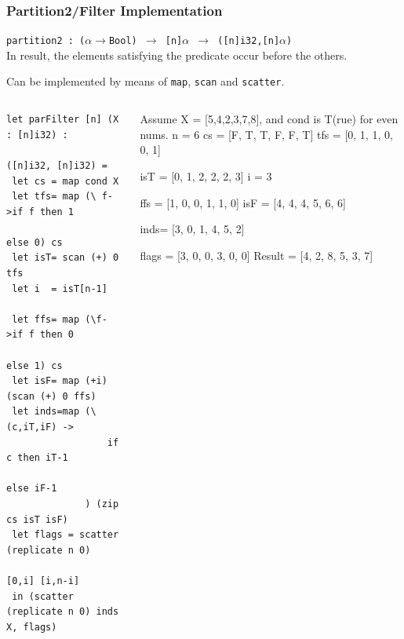 \documentclass{beamer}
\renewcommand{\emph}[1]{\textcolor{structure}{#1}}
\newcommand{\emp}[1]{\textcolor{DikuRed}{ #1}}
\newcommand{\mymath}[1]{$ #1 $}
\newcommand{\myindu}[1]{^{#1}}
\begin{document}
\begin{frame}[fragile,t]
  \frametitle{Partition2/Filter Implementation}


\emph{\tt partition2 : ($\alpha\rightarrow$Bool) $\rightarrow$ [n]$\alpha$ $\rightarrow$ ([n]i32,[n]$\alpha$)}\\
In result, the elements satisfying the predicate occur before the others.

\emp{Can be implemented by means of {\tt map}, {\tt scan} and {\tt scatter}.}\pause


\begin{columns}
  \lstset{basicstyle=\scriptsize}
  \begin{lstlisting}
let parFilter [n] (X : [n]i32) : 
              ([n]i32, [n]i32) =
 let cs = map cond X
 let tfs= map (\ f->if f then 1 
                         else 0) cs
 let isT= scan (+) 0 tfs
 let i  = isT[n-1]

 let ffs= map (\f->if f then 0 
                        else 1) cs
 let isF= map (+i) (scan (+) 0 ffs)
 let inds=map (\(c,iT,iF) -> 
                  if c then iT-1 
                       else iF-1
              ) (zip cs isT isF)
 let flags = scatter (replicate n 0) 
                     [0,i] [i,n-i]
 in (scatter (replicate n 0) inds X, flags)
\end{lstlisting}
  \lstset{basicstyle=\small}
%
%
\vspace{-2ex}
\begin{colorcode}[fontsize=\scriptsize]
Assume X = [5,4,2,3,7,8], and 
cond is T(rue) for even nums.\pause
n   = 6
cs  = [F, T, T, F, F, T]
tfs = [0, 1, 1, 0, 0, 1]

isT = [0, 1, 2, 2, 2, 3]
i   = 3

ffs = [1, 0, 0, 1, 1, 0]
isF = [4, 4, 4, 5, 6, 6]

inds= [3, 0, 1, 4, 5, 2]


flags  = [3, 0, 0, 3, 0, 0]
Result = [4, 2, 8, 5, 3, 7] 
\end{colorcode}
\end{columns}

\end{frame}
\end{document}
